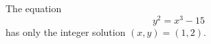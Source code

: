 \begin{proposition}
    The equation
\[
    y^2=x^3-15
\]
    has only the integer solution $(x,y)=(1,2)$.
\end{proposition}
